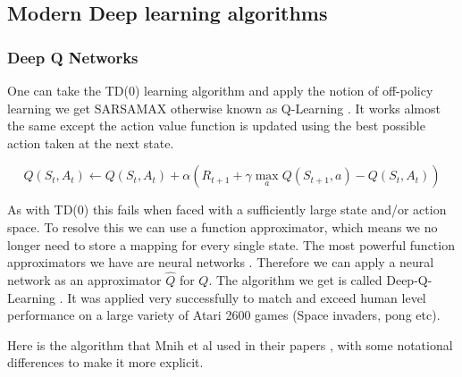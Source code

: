 \subsection{Modern Deep learning algorithms}\label{sec:MDLA}

\subsubsection{Deep Q Networks}
\label{subsec:DQN}

One can take the TD(0) learning algorithm and apply the notion of off-policy learning we get SARSAMAX otherwise known as Q-Learning \cite{watkinsLearningDelayedReward1989} \cite{watkinsQlearning1992} . It works almost the same except the action value function is updated using the best possible action taken at the next state.

\begin{equation}
Q(S_{t}, A_{t}) \leftarrow Q(S_{t}, A_{t}) + \alpha \left( R_{t+1}+\gamma \max_{a} Q(S_{t+1}, a) - Q(S_{t}, A_{t}) \right) 
\end{equation}

As with TD(0) this fails when faced with a sufficiently large state and/or action space. To resolve this we can use a function approximator, which means we no longer need to store a mapping for every single state. The most powerful function approximators we have are neural networks \cite{hornikMultilayerFeedforwardNetworks1989}. Therefore we can apply a neural network as an approximator $\hat{Q}$ for $Q$. The algorithm we get is called Deep-Q-Learning \cite{mnihPlayingAtariDeep2013}\cite{mnihHumanlevelControlDeep2015}. It was applied very successfully to match and exceed human level performance on a large variety of Atari 2600 games (Space invaders, pong etc).

Here is the algorithm that Mnih et al used in their papers \cite{mnihPlayingAtariDeep2013} \cite{mnihHumanlevelControlDeep2015}, with some notational differences to make it more explicit.

